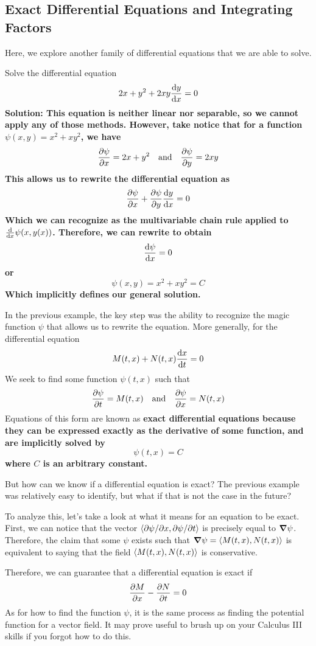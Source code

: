 \subsection{Exact Differential Equations and Integrating Factors}
Here, we explore another family of differential equations that we are able to solve. 
\begin{example}
    Solve the differential equation
    \[ 2x + y^2 + 2xy\dv{y}{x} = 0 \] 
    \bf{Solution:} This equation is neither linear nor separable, so we cannot apply any of those methods. However, take notice that for a function $\psi(x, y) = x^2+xy^2$, we have
    \[ \pdv{\psi}{x} = 2x + y^2 \quad\text{and}\quad \pdv{\psi}{y} = 2xy \]
    This allows us to rewrite the differential equation as
    \[ \pdv{\psi}{x} + \pdv{\psi}{y}\dv{y}{x} = 0\]
    Which we can recognize as the multivariable chain rule applied to $\dv{x} \psi(x,y(x))$. Therefore, we can rewrite to obtain
    \[ \dv{\psi}{x} = 0 \]
    or
    \[ \psi(x,y) = x^2 + xy^2 = C \]
    Which implicitly defines our general solution.
\end{example}
In the previous example, the key step was the ability to recognize the magic function $\psi$ that allows us to rewrite the equation. More generally, for the differential equation
\[ M(t,x ) + N(t, x)\dv{x}{t} = 0\]
We seek to find some function $\psi(t, x)$ such that
\[ \pdv{\psi}{t} = M(t, x) \quad \text{and}\quad \pdv{\psi}{x} = N(t,x)\]
Equations of this form are known as \bf{exact differential equations} because they can be expressed exactly as the derivative of some function, and are implicitly solved by 
\[ \psi(t, x) = C\]
where $C$ is an arbitrary constant. \par
But how can we know if a differential equation is exact? The previous example was relatively easy to identify, but what if that is not the case in the future? \par
To analyze this, let's take a look at what it means for an equation to be exact. First, we can notice that the vector $\left\langle \partial \psi /\partial x, \partial \psi/\partial t\right\rangle$ is precisely equal to $\grad \psi$. Therefore, the claim that some $\psi$ exists such that $\grad\psi = \left\langle M(t,x), N(t,x)\right\rangle$ is equivalent to saying that the field $\left\langle M(t,x), N(t,x)\right\rangle$ is conservative. \par
Therefore, we can guarantee that a differential equation is exact if 
\[ \pdv{M}{x} - \pdv{N}{t} = 0\]
As for how to find the function $\psi$, it is the same process as finding the potential function for a vector field. It may prove useful to brush up on your Calculus III skills if you forgot how to do this. 
